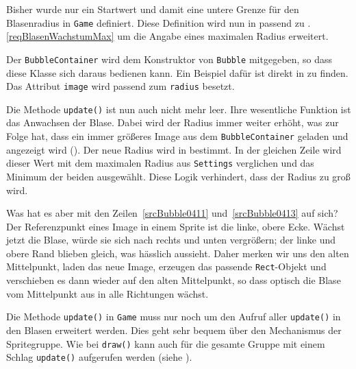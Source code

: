 
Bisher wurde nur ein Startwert und damit eine untere Grenze für den Blasenradius in \texttt{Game} definiert. Diese Definition wird nun in  passend zu .\ref{reqBlasenWachstumMax} um die Angabe eines maximalen Radius erweitert.


Der \texttt{BubbleContainer} wird dem Konstruktor von \texttt{Bubble} mitgegeben, so dass diese Klasse sich daraus bedienen kann. Ein Beispiel dafür ist direkt in  zu finden. Das Attribut \texttt{image} wird passend zum \texttt{radius} besetzt.

Die Methode \texttt{update()} ist nun auch nicht mehr leer. Ihre wesentliche Funktion ist das Anwachsen der Blase. Dabei wird der Radius immer weiter erhöht, was zur Folge hat, dass ein immer größeres Image aus dem \texttt{BubbleContainer} geladen und angezeigt wird (). Der neue Radius wird in  bestimmt. In der gleichen Zeile wird dieser Wert mit dem maximalen Radius aus \texttt{Settings} verglichen und das Minimum der beiden ausgewählt. Diese Logik verhindert, dass der Radius zu groß wird.

Was hat es aber mit den Zeilen~\ref{srcBubble0411} und~\ref{srcBubble0413} auf sich? Der Referenzpunkt eines Image in einem Sprite ist die linke, obere Ecke. Wächst jetzt die Blase, würde sie sich nach rechts und unten vergrößern; der linke und obere Rand blieben gleich, was hässlich aussieht. Daher merken wir uns den alten Mittelpunkt, laden das neue Image, erzeugen das passende \texttt{Rect}-Objekt und verschieben es dann wieder auf den alten Mittelpunkt, so dass optisch die Blase vom Mittelpunkt aus in alle Richtungen wächst.


Die Methode \texttt{update()} in \texttt{Game} muss nur noch um den Aufruf aller \texttt{update()} in den Blasen erweitert werden. Dies geht sehr bequem über den Mechanismus der Spritegruppe. Wie bei \texttt{draw()} kann auch für die gesamte Gruppe mit einem Schlag \texttt{update()} aufgerufen werden (siehe ).

